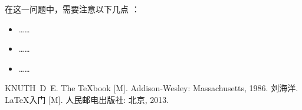 \documentclass[
    10pt,
    oneside,
    openany,
    b5paper,
    colorscheme = black  %
]{qyxf-book}
\begin{document}
\analysis 在这一问题中，需要注意以下几点 \cite{texbook,latex}：
\begin{itemize}
    \item ……
    \item ……
    \item ……
\end{itemize}

\begin{thebibliography}{99}
 KNUTH~D~E. The \TeX book [M]. Addison-Wesley: Massachusetts, 1986.
 刘海洋. \LaTeX 入门 [M]. 人民邮电出版社: 北京, 2013.
\end{thebibliography}
\end{document}
